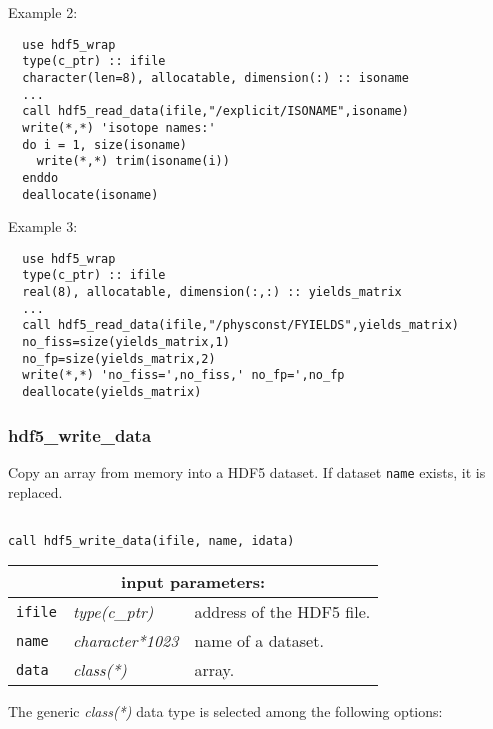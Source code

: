 \noindent Example 2:
\begin{verbatim}
  use hdf5_wrap
  type(c_ptr) :: ifile
  character(len=8), allocatable, dimension(:) :: isoname
  ...
  call hdf5_read_data(ifile,"/explicit/ISONAME",isoname)
  write(*,*) 'isotope names:'
  do i = 1, size(isoname)
    write(*,*) trim(isoname(i))
  enddo
  deallocate(isoname)
\end{verbatim}

\vskip 0.3cm

\noindent Example 3:
\begin{verbatim}
  use hdf5_wrap
  type(c_ptr) :: ifile
  real(8), allocatable, dimension(:,:) :: yields_matrix
  ...
  call hdf5_read_data(ifile,"/physconst/FYIELDS",yields_matrix)
  no_fiss=size(yields_matrix,1)
  no_fp=size(yields_matrix,2)
  write(*,*) 'no_fiss=',no_fiss,' no_fp=',no_fp
  deallocate(yields_matrix)
\end{verbatim}

\subsubsection{hdf5\_write\_data}

Copy an array from memory into a HDF5 dataset.  If dataset {\tt name} exists, it is replaced.

\begin{verbatim}

call hdf5_write_data(ifile, name, idata)
\end{verbatim}

\noindent
\begin{tabular}{|p{1.5cm}|p{3cm}|p{10cm}|}
\hline
\multicolumn{3}{|c|}{\bf input parameters:} \\
\hline
{\tt ifile} & {\it type(c\_ptr)} & address of the HDF5 file. \\
\hline
{\tt name} & {\it character*1023} & name of a dataset. \\
\hline
{\tt data} & {\it class(*)} & array.\\
\hline
\end{tabular}

\vskip 0.5cm
\goodbreak

\noindent The generic {\it class(*)} data type is selected among the following options:

